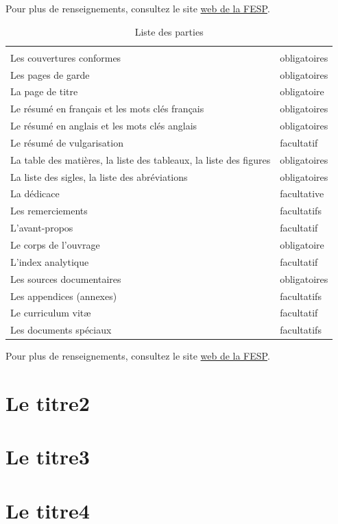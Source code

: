 \documentclass[12pt,maitrise,frenchb,natbib,twoside,initial]{dms}
\numberwithin{equation}{section}
\numberwithin{table}{chapter}
\numberwithin{figure}{chapter}
\begin{document}
Pour plus de renseignements, consultez le site \href{http://www.fesp.umontreal.ca}{web de la FESP}.
\begin{table}[htb]
	\renewcommand{\arraystretch}{1.25}
	\newcommand{\dotrule}[1]{\parbox[t]{#1}{\dotfill}}
	\centering
	\caption[Titre alternatif pour la table des mati\`eres]{Liste des parties}
	\label{tab:parties}
	\begin{tabular}{p{}@{\hspace{}}p{0.15\textwidth}}
		\hline\hline & \\[-3mm]
  		Les couvertures conformes 											& obligatoires			\\
		Les pages de garde 													& obligatoires			\\
		La page de titre 													& obligatoire			\\
		Le résumé en français et les mots clés français						& obligatoires			\\
		Le résumé en anglais et les mots clés anglais 						& obligatoires			\\
		Le résumé de vulgarisation											& facultatif			\\
		La table des mati\`eres, la liste des tableaux, la liste des figures 	& obligatoires			\\
		La liste des sigles, la liste des abréviations						& obligatoires			\\
		La dédicace															& facultative			\\
		Les remerciements 													& facultatifs			\\
		L'avant-propos 														& facultatif			\\
		Le corps de l'ouvrage												& obligatoire			\\
		L'index analytique													& facultatif			\\
		Les sources documentaires 											& obligatoires			\\
		Les appendices (annexes) 											& facultatifs			\\
		Le curriculum vit\ae{}												& facultatif			\\
		Les documents spéciaux 												& facultatifs			\\
		[3mm] \hline\hline
	\end{tabular}
\end{table}
Pour plus de renseignements, consultez le site \href{http://www.fesp.umontreal.ca}{web de la FESP}.

\chapter{Le titre2}
\chapter{Le titre3}
\chapter{Le titre4}
\end{document}
